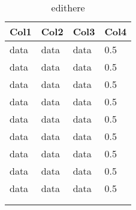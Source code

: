 \begin{longtable}[]{@{}llll@{}}
    \toprule
    Col1 & Col2 & Col3 & Col4 \tabularnewline
    \midrule
    \endhead
    data & data & data & 0.5 \tabularnewline
    data & data & data & 0.5 \tabularnewline
    data & data & data & 0.5 \tabularnewline
    data & data & data & 0.5 \tabularnewline
    data & data & data & 0.5 \tabularnewline
    data & data & data & 0.5 \tabularnewline
    data & data & data & 0.5 \tabularnewline
    data & data & data & 0.5 \tabularnewline
    data & data & data & 0.5 \tabularnewline
    \bottomrule
    \label{tab:edithere}
    \\
    \caption{edithere}
 \end{longtable}
